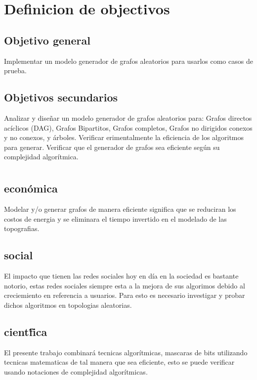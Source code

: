 \documentclass[11pt]{extarticle}
\begin{document}
\section{Definicion de objectivos}
  \subsection{Objetivo general}
  Implementar un modelo generador de grafos aleatorios para usarlos como casos de prueba.
  \subsection{Objetivos secundarios}
      \begin{itemize}
        \guion Analizar y diseñar un modelo generador de grafos aleatorios para: Grafos directos acíclicos (DAG), Grafos Bipartitos, Grafos completos, Grafos no dirigidos conexos y no conexos, y árboles.
        \guion Verificar erimentalmente  la eficiencia de los algoritmos para generar.
        \guion Verificar que el generador de grafos sea eficiente según su complejidad algorítmica.
      \end{itemize}
\section{\justificacion}
  \subsection{\justificacion econ\'omica}
    Modelar y/o generar grafos de manera eficiente significa que se reduciran los costos de energia y se
    eliminara el tiempo invertido en el modelado de las topografias. 
  \subsection{\justificacion social}
    El impacto que tienen las redes sociales hoy en d\'ia en la sociedad es bastante notorio,
    estas redes sociales siempre esta a la mejora de sus algorimos debido al creciemiento en referencia a usuarios.
    Para esto es necesario investigar y probar dichos algoritmos en topologias aleatorias.
  \subsection{\justificacion cient\'fica}
    El presente trabajo combinar\'a tecnicas algor\'itmicas, mascaras de bits utilizando tecnicas
    matematicas de tal manera que sea eficiente,
    esto se puede verificar usando notaciones de complejidad algor\'itmicas.
\end{document}
